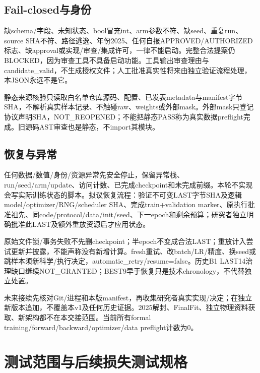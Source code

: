 \documentclass[UTF8,fontset=fandol,10pt]{ctexart}
\begin{document}
\subsection{Fail-closed与身份}

缺schema/\allowbreak{}字段、未知状态、bool冒充int、arm参数不符、缺seed、重复run、source SHA不符、路径逃逸、年份2025、任何自报APPROVED/\allowbreak{}AUTHORIZED标志、缺approval或实现/\allowbreak{}审查/\allowbreak{}集成许可，一律不能启动。完整合法提案仍BLOCKED，因为审查工具不具备启动功能。工具输出审查理由与candidate\_\allowbreak{}valid，不生成授权文件；人工批准真实性将来由独立验证流程处理，本JSON永远不是它。

静态来源核验只读取白名单仓库源码、配置、已发表metadata与manifest字节SHA，不解析真实样本记录、不触碰raw、weights或外部mask。外部mask只登记协议声明SHA，NOT\_\allowbreak{}REOPENED；不能把静态PASS称为真实数据preflight完成。旧源码AST审查也是静态，不import其模块。

\subsection{恢复与异常}

任何数据/\allowbreak{}数值/\allowbreak{}身份/\allowbreak{}资源异常先安全停止，保留异常栈、run/\allowbreak{}seed/\allowbreak{}arm/\allowbreak{}update、访问计数、已完成checkpoint和未完成前缀。本轮不实现会写实际训练状态的脚本。拟议恢复流程：验证不可变LAST字节SHA及逻辑model/\allowbreak{}optimizer/\allowbreak{}RNG/\allowbreak{}scheduler SHA、完成train+validation marker、原执行批准祖先、同code/\allowbreak{}protocol/\allowbreak{}data/\allowbreak{}init/\allowbreak{}seed、下一epoch和剩余预算；研究者独立明确批准此LAST及额外重放资源后才应用状态。

原始文件锁/\allowbreak{}事务失败不先删checkpoint；半epoch不变成合法LAST；重放计入尝试更新并披露，不能声称没有新增计算。fresh重试、改batch/\allowbreak{}LR/\allowbreak{}精度、换seed或跳样本须新科学/\allowbreak{}执行决定，automatic\_\allowbreak{}retry/\allowbreak{}resume=false。历史B1 LAST14治理缺口继续NOT\_\allowbreak{}GRANTED；BEST9早于恢复只是技术chronology，不代替独立处置。

未来接续先核对Git/\allowbreak{}进程和本版manifest，再收集研究者真实实现/\allowbreak{}决定；在独立新版本追加，不覆盖本v1及任何历史证据。2025解封、FinalFit、独立物理资料获取、新架构都不在本交接范围。当前所有formal training/\allowbreak{}forward/\allowbreak{}backward/\allowbreak{}optimizer/\allowbreak{}data preflight计数为0。
\clearpage\section{测试范围与后续损失测试规格}
\end{document}
